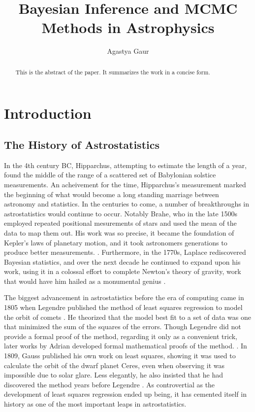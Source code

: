 \documentclass[preprint2,linenumbers,longauthor]{aastex631}
\begin{document}
\label{placeholder} %

\title{Bayesian Inference and MCMC Methods in Astrophysics}
\author{Agastya Gaur}

\begin{abstract}
  This is the abstract of the paper. It summarizes the work in a concise form.
\end{abstract}

\tableofcontents

\section{Introduction}
\label{sec:Introduction}
\subsection{The History of Astrostatistics}
In the 4th century BC, Hipparchus, attempting to estimate the length of a year, found the middle of the range of a scattered set of Babylonian solstice measurements. An acheivement for the time, Hipparchus's measurement marked the beginning of what would become a long standing marriage between astronomy and statistics. In the centuries to come, a number of breakthroughs in astrostatistics would continue to occur. Notably Brahe, who in the late 1500s employed repeated positional mesurements of stars and used the mean of the data to map them out. His work was so precise, it became the foundation of Kepler's laws of planetary motion, and it took astronomers generations to produce better measurements. \citep{leavesleyTychoBrahesWay2018}. Furthermore, in the 1770s, Laplace rediscovered Bayesian statistics, and over the next decade he continued to expand upon his work, using it in a colossal effort to complete Newton's theory of gravity, work that would have him hailed as a monumental genius \citep{stiglerStudiesHistoryProbability1975}.

The biggest advancement in astrostatistics before the era of computing came in 1805 when Legendre published the method of least squares regression to model the orbit of comets \citep{feigelsonStatisticalChallengesModern2004}. He theorized that the model best fit to a set of data was one that minimized the sum of the squares of the errors. Though Legendre did not provide a formal proof of the method, regarding it only as a convenient trick, later works by Adrian developed formal mathematical proofs of the method. \citep{merrimanHistoryMethodLeast1877}. In 1809, Gauss published his own work on least squares, showing it was used to calculate the orbit of the dwarf planet Ceres, even when observing it was impossible due to solar glare. Less elegantly, he also insisted that he had discovered the method years before Legendre \citep{stiglerGaussInventionLeast1981}. As controvertial as the development of least squares regression ended up being, it has cemented itself in history as one of the most important leaps in astrostatistics.
\end{document}
